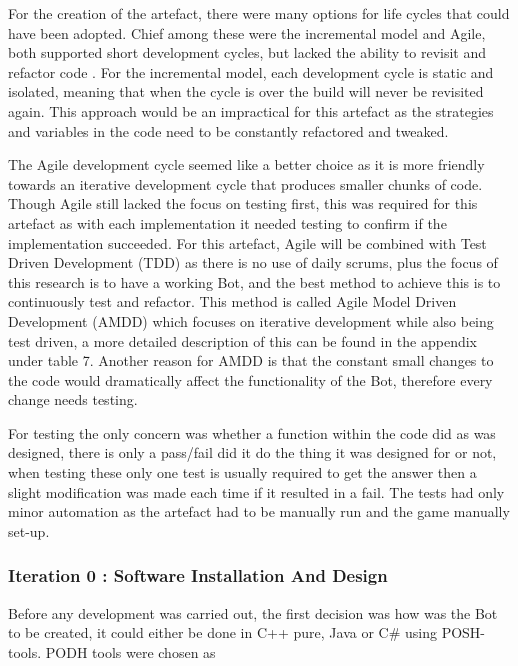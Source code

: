 \documentclass[journal]{IEEEtran}
\begin{document}
	For the creation of the artefact, there were many options for life cycles that could have been adopted. Chief among these were the incremental model and Agile, both supported short development cycles, but lacked the ability to revisit and refactor code \cite{Life}. For the incremental model, each development cycle is static and isolated, meaning that when the cycle is over the build will never be revisited again. This approach would be an impractical for this artefact as the strategies and variables in the code need to be constantly refactored and tweaked.
	
	The Agile development cycle seemed like a better choice as it is more friendly towards an iterative development cycle that produces smaller chunks of code. Though Agile still lacked the focus on testing first, this was required for this artefact as with each implementation it needed testing to confirm if the implementation succeeded. For this artefact, Agile will be combined with Test Driven Development (TDD) as there is no use of daily scrums, plus the focus of this research is to have a working Bot, and the best method to achieve this is to continuously test and refactor. This method is called Agile Model Driven Development (AMDD) which focuses on iterative development while also being test driven, a more detailed description of this can be found in the appendix under table 7. Another reason for AMDD is that the constant small changes to the code would dramatically affect the functionality of the Bot, therefore every change needs testing.
	
	For testing the only concern was whether a function within the code did as was designed, there is only a pass/fail did it do the thing it was designed for or not, when testing these only one test is usually required to get the answer then a slight modification was made each time if it resulted in a fail. The tests had only minor automation as the artefact had to be manually run and the game manually set-up.
	\newline
	
	\subsubsection{Iteration 0 : Software Installation And Design}
	Before any development was carried out, the first decision was how was the Bot to be created, it could either be done in C++ pure, Java or C\# using POSH-tools. PODH tools were chosen as
	
\end{document}
